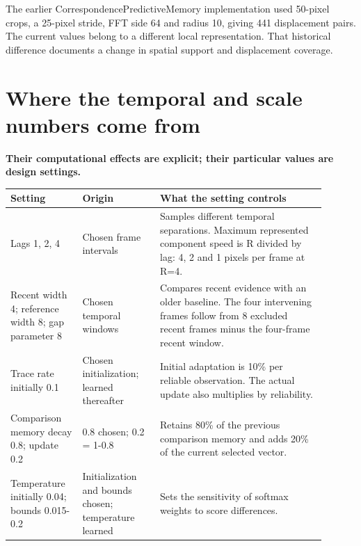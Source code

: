 \documentclass[11pt,letterpaper]{article}
\begin{document}
The earlier CorrespondencePredictiveMemory implementation used 50-pixel crops, a 25-pixel stride, FFT side 64 and radius 10, giving 441 displacement pairs. The current values belong to a different local representation. That historical difference documents a change in spatial support and displacement coverage.


\clearpage

\section{Where the temporal and scale numbers come from}\label{sec20}

\textbf{Their computational effects are explicit; their particular values are design settings.}


\begin{center}\small\renewcommand{\arraystretch}{1.16}\setlength{\tabcolsep}{4pt}\begin{tabular}{p{0.206\linewidth}p{0.224\linewidth}p{0.470\linewidth}}\toprule

\textbf{Setting} & \textbf{Origin} & \textbf{What the setting controls} \\

\midrule

Lags 1, 2, 4 & Chosen frame intervals & Samples different temporal separations. Maximum represented component speed is R divided by lag: 4, 2 and 1 pixels per frame at R=4. \\

Recent width 4; reference width 8; gap parameter 8 & Chosen temporal windows & Compares recent evidence with an older baseline. The four intervening frames follow from 8 excluded recent frames minus the four-frame recent window. \\

Trace rate initially 0.1 & Chosen initialization; learned thereafter & Initial adaptation is 10\% per reliable observation. The actual update also multiplies by reliability. \\

Comparison memory decay 0.8; update 0.2 & 0.8 chosen; 0.2 = 1-0.8 & Retains 80\% of the previous comparison memory and adds 20\% of the current selected vector. \\

Temperature initially 0.04; bounds 0.015-0.2 & Initialization and bounds chosen; temperature learned & Sets the sensitivity of softmax weights to score differences. \\


\end{tabular}
\end{center}
\end{document}
